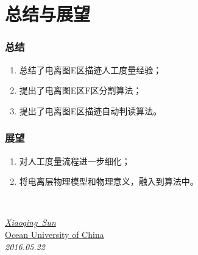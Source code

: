 \documentclass[notheorems,mathserif,table,compress]{beamer}  %
\begin{document}
\section{总结与展望}
\begin{frame}
  \frametitle{总结}
  \begin{enumerate}
  \item 总结了电离图E区描迹人工度量经验；
  \item 提出了电离图E区F区分割算法；
  \item 提出了电离图E区描迹自动判读算法。
  \end{enumerate}
\end{frame}

\begin{frame}
  \frametitle{展望}
  \begin{enumerate}
  \item 对人工度量流程进一步细化；
  \item 将电离层物理模型和物理意义，融入到算法中。
  \end{enumerate}
\end{frame}


\begin{frame}
\vspace{2cm}

\\
\vspace{1.5cm}

\begin{flushright}
\emph{\href{mailto:zhaohongmiao0627@226.com}{\textrm {Xiaoqing~Sun}}}\\
\href{http://www.ouc.edu.cn}{\textrm {Ocean University of China}}\\
\emph{\textrm {2016.05.22}}
\end{flushright}  
\end{frame}
\end{document}
